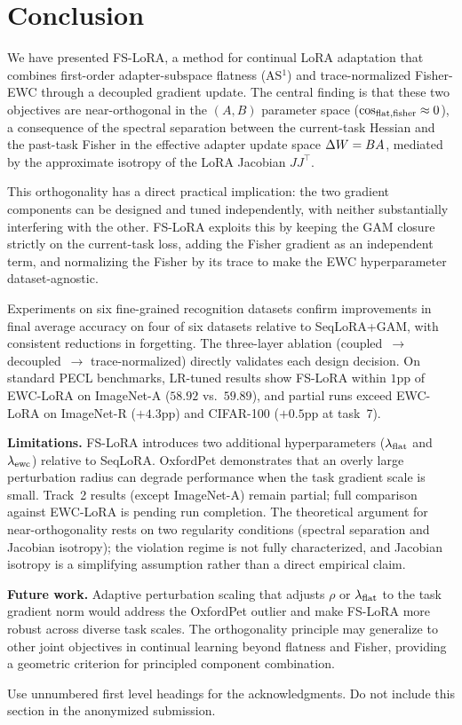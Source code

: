 \section{Conclusion}
\label{sec:conclusion}

We have presented FS-LoRA, a method for continual LoRA adaptation that combines
first-order adapter-subspace flatness (AS$^1$) and trace-normalized Fisher-EWC
through a decoupled gradient update.
The central finding is that these two objectives are near-orthogonal in the $(A,B)$ parameter space
($\cos_{\mathrm{flat,fisher}} \approx 0$), a consequence of the spectral separation between the current-task Hessian
and the past-task Fisher in the effective adapter update space $\Delta W = BA$,
mediated by the approximate isotropy of the LoRA Jacobian $JJ^\top$.

This orthogonality has a direct practical implication: the two gradient components
can be designed and tuned independently, with neither substantially interfering with the other.
FS-LoRA exploits this by keeping the GAM closure strictly on the current-task loss,
adding the Fisher gradient as an independent term, and normalizing the Fisher by its
trace to make the EWC hyperparameter dataset-agnostic.

Experiments on six fine-grained recognition datasets confirm improvements
in final average accuracy on four of six datasets relative to SeqLoRA+GAM,
with consistent reductions in forgetting.
The three-layer ablation (coupled~$\to$ decoupled~$\to$ trace-normalized)
directly validates each design decision.
On standard PECL benchmarks, LR-tuned results show FS-LoRA within $1$pp of EWC-LoRA
on ImageNet-A ($58.92$ vs.\ $59.89$), and partial runs exceed EWC-LoRA on
ImageNet-R ($+4.3$pp) and CIFAR-100 ($+0.5$pp at task~7).

\textbf{Limitations.}
FS-LoRA introduces two additional hyperparameters ($\lambda_{\mathrm{flat}}$ and $\lambda_{\mathrm{ewc}}$) relative to SeqLoRA.
OxfordPet demonstrates that an overly large perturbation radius can degrade performance
when the task gradient scale is small.
Track~2 results (except ImageNet-A) remain partial; full comparison against EWC-LoRA
is pending run completion.
The theoretical argument for near-orthogonality rests on two regularity conditions
(spectral separation and Jacobian isotropy); the violation regime is not fully characterized,
and Jacobian isotropy is a simplifying assumption rather than a direct empirical claim.

\textbf{Future work.}
Adaptive perturbation scaling that adjusts $\rho$ or $\lambda_{\mathrm{flat}}$ to the task gradient norm
would address the OxfordPet outlier and make FS-LoRA more robust across diverse task scales.
The orthogonality principle may generalize to other joint objectives in continual learning
beyond flatness and Fisher, providing a geometric criterion for principled component combination.

\begin{ack}
Use unnumbered first level headings for the acknowledgments.
Do not include this section in the anonymized submission.
\end{ack}
